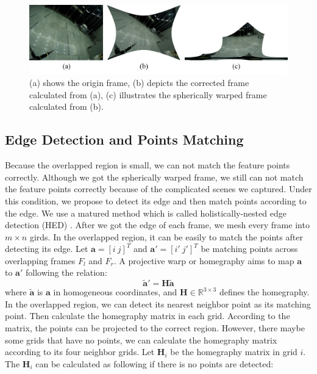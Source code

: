 \documentclass[conference]{IEEEtran}
\begin{document}
\begin{figure}[t]
\centering
\includegraphics[scale=0.23]{picture40.png}
\caption{(a) shows the origin frame, (b) depicts the corrected frame calculated from (a), (c) illustrates the spherically warped frame calculated from (b).}
\label{fig:ori_cal_pro}
\end{figure}
\subsection{Edge Detection and Points Matching}
\label{ssec:edge-detection}
Because the overlapped region is small, we can not match the feature points correctly. Although we got the spherically warped frame, we still can not 
match the feature points correctly because of the complicated scenes we captured. Under this condition, we propose to detect its edge and then match points according to the edge.
We use a matured method which is called holistically-nested edge detection (HED) \cite{xie2015holistically}. After we got the edge of each frame, we mesh every frame into $m \times n$
girds. In the overlapped region, it can be easily to match the points after detecting its edge. Let $\textbf{a} = [i \ j]^T$ and $\textbf{a}' = [i' \ j']^T$ be matching points
across overlapping frames $F_l$ and $F_r$. A projective warp or homegraphy aims to map $\textbf{a}$ to $\textbf{a}'$ following the relation:
\begin{equation}
\widetilde{\textbf{a}}'=\textbf{H}\widetilde{\textbf{a}}
\end{equation}
where $\widetilde{\textbf{a}}$ is $\textbf{a}$ in homogeneous coordinates, and $\textbf{H}\in\mathbb{R}^{3 \times 3}$ defines the homegraphy. In the overlapped region,
we can detect its nearest neighbor point as its matching point. Then calculate the homegraphy matrix in each grid. According to the matrix, the points can be projected to the correct region.
However, there maybe some grids that have no points, we can calculate the homegraphy matrix according to its four neighbor grids. Let $\textbf{H}_i$ be the homegraphy matrix in grid $i$.
The $\textbf{H}_{i}$ can be calculated as following if there is no points are detected:
\end{document}
